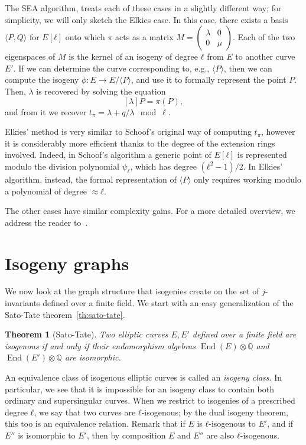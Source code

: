 \documentclass[10pt]{article}
\theoremstyle{plain}
\newtheorem{theorem}{Theorem}
\theoremstyle{definition}
\DeclareMathOperator{\End}{End} %
\begin{document}
The SEA algorithm, treats each of these cases in a slightly different
way; for simplicity, we will only sketch the Elkies case. %
In this case, there exists a basis $〈P,Q〉$ for $E[ℓ]$ onto which $π$
acts as a matrix
$M=\left(\begin{smallmatrix}λ&0\\0&μ\end{smallmatrix}\right)$. %
Each of the two eigenspaces of $M$ is the kernel of an isogeny of
degree $ℓ$ from $E$ to another curve $E'$. %
If we can determine the curve corresponding to, e.g., $〈P〉$, then we
can compute the isogeny $ϕ:E\to E/〈P〉$, and use it to formally
represent the point $P$. %
Then, $λ$ is recovered by solving the equation
\[[λ]P = π(P),\]
and from it we recover $t_π = λ + q/λ \mod \ell$.

Elkies' method is very similar to Schoof's original way of computing
$t_π$, however it is considerably more efficient thanks to the degree
of the extension rings involved. %
Indeed, in Schoof's algorithm a generic point of $E[ℓ]$ is represented
modulo the division polynomial $ψ_ℓ$, which has degree $(ℓ^2-1)/2$. %
In Elkies' algorithm, instead, the formal representation of $〈P〉$
only requires working modulo a polynomial of degree $≈ℓ$.

The other cases have similar complexity gains. %
For a more detailed overview, we address the reader
to~\cite{schoof95,lercier-algorithmique,elkies98,sutherland10}.

\section{Isogeny graphs}

We now look at the graph structure that isogenies create on the set of
$j$-invariants defined over a finite field. %
We start with an easy generalization of the Sato-Tate
theorem~\ref{th:sato-tate}.

\begin{theorem}[Sato-Tate]
  \label{th:sato-tate2}
  Two elliptic curves $E,E'$ defined over a finite field are isogenous
  if and only if their endomorphism algebras $\End(E)⊗ℚ$ and
  $\End(E')⊗ℚ$ are isomorphic.
\end{theorem}

An equivalence class of isogenous elliptic curves is called an
\emph{isogeny class}. %
In particular, we see that it is impossible for an isogeny class to
contain both ordinary and supersingular curves. %
When we restrict to isogenies of a prescribed degree $ℓ$, we say that
two curves are $ℓ$-isogenous; by the dual isogeny theorem, this too is
an equivalence relation. %
Remark that if $E$ is $ℓ$-isogenous to $E'$, and if $E''$ is
isomorphic to $E'$, then by composition $E$ and $E''$ are also
$ℓ$-isogenous. %
\end{document}
